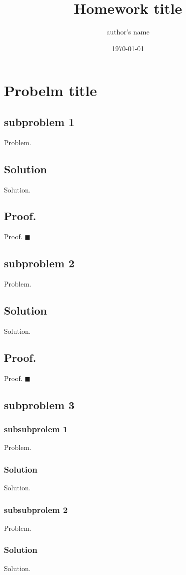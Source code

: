 \documentclass{article}
\title{Homework title}
\author{author's name}
\date{\today}
\begin{document}
\maketitle

\section*{Probelm title}
\subsection*{subproblem 1}
  Problem.
\subsection*{Solution}
  Solution.
 \subsection*{Proof.}
  Proof.
 $ \blacksquare $
\subsection*{subproblem 2}
  Problem.
\subsection*{Solution}
  Solution.
 \subsection*{Proof.}
  Proof.
 $ \blacksquare $
\subsection*{subproblem 3}
  	\subsubsection*{subsubprolem 1}
  	Problem. 
	\subsubsection*{Solution}
  	Solution.
  	\subsubsection*{subsubprolem 2}
  	Problem.
	\subsubsection*{Solution}
  	Solution.
\end{document}
